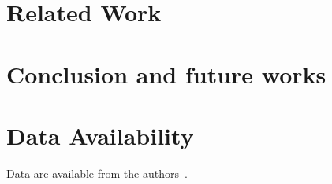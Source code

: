 \documentclass[acmsmall]{acmart}
\begin{document}
\section{Related Work}

\section{Conclusion and future works}


\section*{Data Availability}
Data are available from the authors~\cite{artifact}.











\end{document}
